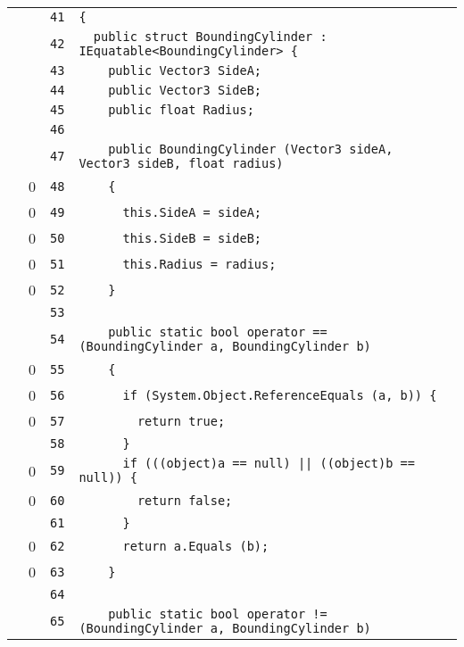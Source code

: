 \documentclass[a4paper,10pt]{article}
\begin{document}
\begin{longtable}[l]{lrrl}
\cellcolor{gray} &  & \verb~41~ & \verb~{~\\
\cellcolor{gray} &  & \verb~42~ & \verb~  public struct BoundingCylinder : IEquatable<BoundingCylinder> {~\\
\cellcolor{gray} &  & \verb~43~ & \verb~    public Vector3 SideA;~\\
\cellcolor{gray} &  & \verb~44~ & \verb~    public Vector3 SideB;~\\
\cellcolor{gray} &  & \verb~45~ & \verb~    public float Radius;~\\
\cellcolor{gray} &  & \verb~46~ & \verb~~\\
\cellcolor{gray} &  & \verb~47~ & \verb~    public BoundingCylinder (Vector3 sideA, Vector3 sideB, float radius)~\\
\cellcolor{red} & 0 & \verb~48~ & \verb~    {~\\
\cellcolor{red} & 0 & \verb~49~ & \verb~      this.SideA = sideA;~\\
\cellcolor{red} & 0 & \verb~50~ & \verb~      this.SideB = sideB;~\\
\cellcolor{red} & 0 & \verb~51~ & \verb~      this.Radius = radius;~\\
\cellcolor{red} & 0 & \verb~52~ & \verb~    }~\\
\cellcolor{gray} &  & \verb~53~ & \verb~~\\
\cellcolor{gray} &  & \verb~54~ & \verb~    public static bool operator == (BoundingCylinder a, BoundingCylinder b)~\\
\cellcolor{red} & 0 & \verb~55~ & \verb~    {~\\
\cellcolor{red} & 0 & \verb~56~ & \verb~      if (System.Object.ReferenceEquals (a, b)) {~\\
\cellcolor{red} & 0 & \verb~57~ & \verb~        return true;~\\
\cellcolor{gray} &  & \verb~58~ & \verb~      }~\\
\cellcolor{red} & 0 & \verb~59~ & \verb~      if (((object)a == null) || ((object)b == null)) {~\\
\cellcolor{red} & 0 & \verb~60~ & \verb~        return false;~\\
\cellcolor{gray} &  & \verb~61~ & \verb~      }~\\
\cellcolor{red} & 0 & \verb~62~ & \verb~      return a.Equals (b);~\\
\cellcolor{red} & 0 & \verb~63~ & \verb~    }~\\
\cellcolor{gray} &  & \verb~64~ & \verb~~\\
\cellcolor{gray} &  & \verb~65~ & \verb~    public static bool operator != (BoundingCylinder a, BoundingCylinder b)~\\

\end{longtable}
\end{document}
